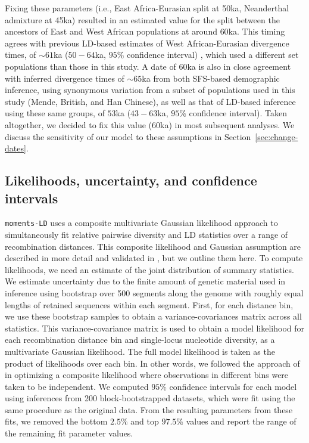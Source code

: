\documentclass[]{article}
\begin{document}
Fixing these parameters (i.e., East Africa-Eurasian split at 50ka, Neanderthal
admixture at 45ka) resulted in an estimated value for the split between the
ancestors of East and West African populations at around $60$ka. This timing
agrees with previous LD-based estimates of West African-Eurasian divergence
times, of $\sim61$ka ($50-64$ka, $95\%$ confidence interval)
\citep{Ragsdale2019-nt}, which used a different set populations than those in
this study. A date of $60$ka is also in close agreement with inferred
divergence times of $\sim65$ka from both SFS-based demographic inference, using
synonymous variation from a subset of populations used in this study (Mende,
British, and Han Chinese), as well as that of LD-based inference using these
same groups, of $53$ka ($43-63$ka, $95\%$ confidence interval). Taken
altogether, we decided to fix this value ($60$ka) in most subsequent analyses.
We discuss the sensitivity of our model to these assumptions in
Section~\ref{sec:change-dates}.

\subsection{Likelihoods, uncertainty, and confidence intervals}
\label{sec:likelihoods-uncertainty}

\texttt{moments-LD} uses a composite multivariate Gaussian likelihood approach
to simultaneously fit relative pairwise diversity and LD statistics over a
range of recombination distances. This composite likelihood and Gaussian
assumption are described in more detail and validated in
\citet{Ragsdale2019-nt}, but we outline them here. To compute likelihoods, we
need an estimate of the joint distribution of summary statistics. We estimate
uncertainty due to the finite amount of genetic material used in inference
using bootstrap over 500 segments along the genome with roughly equal lengths
of retained sequences within each segment. First, for each distance bin, we use
these bootstrap samples to obtain a variance-covariances matrix across all
statistics. This variance-covariance matrix is used to obtain a model
likelihood for each recombination distance bin and single-locus nucleotide
diversity, as a multivariate Gaussian likelihood. The full model likelihood is
taken as the product of likelihoods over each bin. In other words, we followed
the approach of \citet{Ragsdale2019-nt} in optimizing a composite likelihood
where observations in different bins were taken to be independent. We computed
$95\%$ confidence intervals for each model using inferences from 200
block-bootstrapped datasets, which were fit using the same procedure as the
original data. From the resulting parameters from these fits, we removed the
bottom $2.5\%$ and top $97.5\%$ values and report the range of the remaining
fit parameter values.
\end{document}
